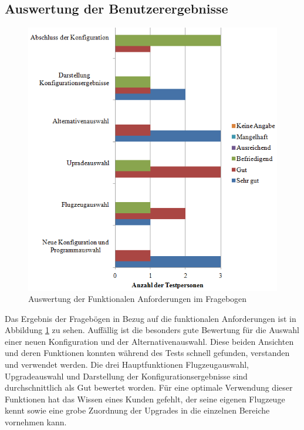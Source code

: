 \subsection{Auswertung der Benutzerergebnisse}
\begin{figure}[H]
\centering
\includegraphics[width=\hsize]{images/bewertung_tablet}
\caption{Auswertung der Funktionalen Anforderungen im Fragebogen}
\label{bewertungTablet}
\end{figure}
Das Ergebnis der Fragebögen in Bezug auf die funktionalen Anforderungen ist in Abbildung \ref{bewertungTablet} zu sehen. Auffällig ist die besonders gute Bewertung für die Auswahl einer neuen Konfiguration und der Alternativenauswahl. Diese beiden Ansichten und deren Funktionen konnten während des Tests schnell gefunden, verstanden und verwendet werden. Die drei Hauptfunktionen Flugzeugauswahl, Upgradeauswahl und Darstellung der Konfigurationsergebnisse sind durchschnittlich als Gut bewertet worden. Für eine optimale Verwendung dieser Funktionen hat das Wissen eines Kunden gefehlt, der seine eigenen Flugzeuge kennt sowie eine grobe Zuordnung der Upgrades in die einzelnen Bereiche vornehmen kann. \par

